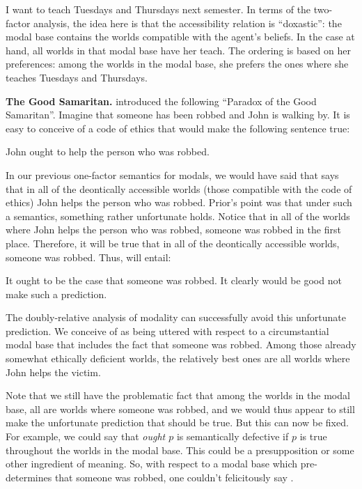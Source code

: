 \ex I want to teach Tuesdays and Thursdays next semester.\xe
%
%
In terms of the two-factor analysis, the idea here is that the accessibility
relation is ``doxastic'': the modal base contains the worlds compatible with the
agent's beliefs. In the case at hand, all worlds in that modal base have her
teach. The ordering is based on her preferences: among the worlds in the modal
base, she prefers the ones where she teaches Tuesdays and Thursdays.

\textbf{The Good Samaritan.} \cite{prior-1958-escapism} introduced the following
``Paradox of the Good Samaritan''. Imagine that someone has been robbed and John
is walking by. It is easy to conceive of a code of ethics that would make the
following sentence true:

\ex John ought to help the person who was robbed.\xe

In our previous one-factor semantics for modals, we would have said that
\Last says that in all of the deontically accessible worlds (those compatible
with the code of ethics) John helps the person who was robbed. Prior's point was
that under such a semantics, something rather unfortunate holds. Notice that in
all of the worlds where John helps the person who was robbed, someone was robbed
in the first place. Therefore, it will be true that in all of the deontically
accessible worlds, someone was robbed. Thus, \Last will entail:

\ex It ought to be the case that someone was robbed.\xe
%
It clearly would be good not make such a prediction.

The doubly-relative analysis of modality can successfully avoid this unfortunate
prediction. We conceive of \LLast as being uttered with respect to a
circumstantial modal base that includes the fact that someone was robbed. Among
those already somewhat ethically deficient worlds, the relatively best ones are
all worlds where John helps the victim.

Note that we still have the problematic fact that among the worlds in the modal
base, all are worlds where someone was robbed, and we would thus appear to still
make the unfortunate prediction that \Last should be true. But this can now
be fixed. For example, we could say that \emph{ought $p$} is semantically
defective if $p$ is true throughout the worlds in the modal base. This could
be a presupposition or some other ingredient of meaning. So, with respect to a
modal base which pre-determines that someone was robbed, one couldn't
felicitously say \Last.

